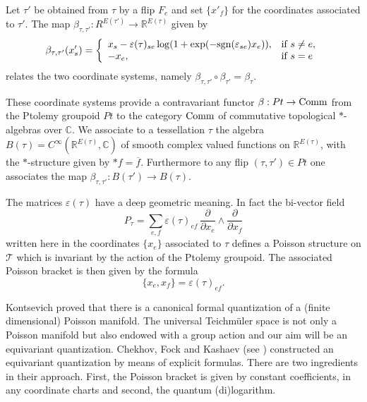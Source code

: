\documentclass[twoside]{irmaems}
\theoremstyle{plain}
\theoremstyle{definition}
\theoremstyle{remark}
\newcommand{\C}{{\mathbb{C}}}
\newcommand{\R}{{\mathbb{R}}}
\begin{document}
\vspace{0.2cm}
\noindent 
Let $\tau'$ be obtained from $\tau$ by a flip $F_e$ and set $\{x'_f\}$ for the 
coordinates associated to $\tau'$.   The map  
$\beta_{\tau,\tau'}:R^{E(\tau')}\to \R^{E(\tau)}$ given  by 
\[ \beta_{\tau,\tau'}(x'_s)=\left\{\begin{array}{ll}
x_s-\varepsilon(\tau)_{se}\log(1+\exp(-{\rm sgn}(\varepsilon_{se})x_e)), & \mbox{\rm if } s\neq e,\\ 
-x_e, &  \mbox{\rm if } s= e\\ 
\end{array}
\right. 
\]
relates the two coordinate systems, namely $\beta_{\tau,\tau'}\circ \beta_{\tau'}=\beta_{\tau}$.  

\vspace{0.2cm}
\noindent 
These coordinate systems provide a contravariant functor $\beta: Pt\to {\rm Comm}$ 
from the Ptolemy groupoid $Pt$ to the category ${\rm Comm}$ of commutative topological 
$*$-algebras over $\C$. We associate to a tessellation $\tau$ the 
algebra $B(\tau)=C^{\infty}(\R^{E(\tau)}, \C)$ of smooth  complex valued 
functions on $\R^{E(\tau)}$, with the $*$-structure given by $*f=\overline{f}$. 
Furthermore to any flip $(\tau,\tau')\in Pt$ one associates the map 
$\beta_{\tau,\tau'}:B(\tau')\to B(\tau)$. 

\vspace{0.2cm}
\noindent 
The matrices $\varepsilon(\tau)$ have a deep geometric meaning. 
In fact the  bi-vector  field 
\[ P_{\tau}=\sum_{e,f} \varepsilon(\tau)_{ef} \,\frac{\partial}{\partial x_e}\wedge 
\frac{\partial}{\partial x_f} \]
written here in the coordinates $\{x_e\}$ associated to $\tau$  
defines a Poisson structure on ${\mathcal T}$ which is invariant by the action 
of the Ptolemy groupoid. The associated Poisson bracket is then given by the formula 
\[ \{x_e,x_f\}=\varepsilon(\tau)_{ef}. \]

\vspace{0.2cm}
\noindent 
Kontsevich proved that  there is a canonical  formal quantization 
of a (finite dimensional) Poisson manifold. The universal Teichm\"uler space 
is not only a Poisson manifold but also endowed with a group action and 
our aim will be an equivariant quantization.  Chekhov, Fock  and Kashaev 
(see \cite{CF,CP,K,K2})  constructed an equivariant  quantization by means of 
explicit formulas. There are two ingredients in their approach. First, 
the Poisson bracket is given by constant coefficients, in any 
coordinate charts and  second,  the quantum (di)logarithm.  
  
\end{document}
